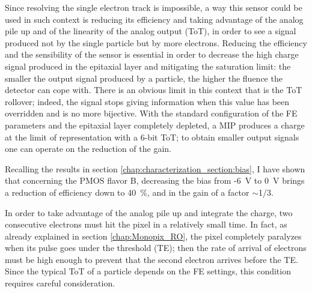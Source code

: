    Since resolving the single electron track is impossible, a way this sensor could be used in such context is reducing its efficiency and taking advantage of the analog pile up and of the linearity of the analog output (ToT), in order to see a signal produced not by the single particle but by more electrons. 
   Reducing the efficiency and the sensibility of the sensor is essential in order to decrease the high charge signal produced in the epitaxial layer and mitigating the saturation limit: the smaller the output signal produced by a particle, the higher the fluence the detector can cope with.
   There is an obvious limit in this context that is the ToT rollover; indeed, the signal stops giving information when this value has been overridden and is no more bijective.
   With the standard configuration of the FE parameters and the epitaxial layer completely depleted, a MIP produces a charge at the limit of representation with a 6-bit ToT; to obtain smaller output signals one can operate on the reduction of the gain.

   Recalling the results in section \ref{chap:characterization_section:bias}, I have shown that concerning the PMOS flavor B, decreasing the bias from -\SI{6}{V} to \SI{0}{V} brings a reduction of efficiency down to \SI{40}{\%}, and in the gain of a factor $\sim$1/3.
   
   In order to take advantage of the analog pile up and integrate the charge, two consecutive electrons must hit the pixel in a relatively small time. In fact, as already explained in section \ref{chap:Monopix_RO}, the pixel completely paralyzes when its pulse goes under the threshold (TE); then the rate of arrival of electrons must be high enough to prevent that the second electron arrives before the TE. Since the typical ToT of a particle depends on the FE settings, this condition requires careful consideration. 
   
